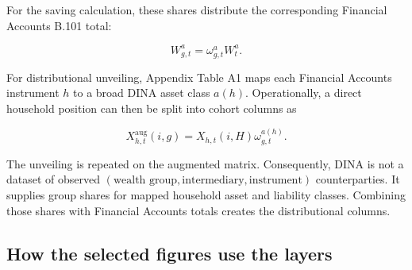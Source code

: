 \documentclass[11pt]{article}
\begin{document}
For the saving calculation, these shares distribute the corresponding
Financial Accounts B.101 total:

\begin{equation}
  W^a_{g,t}=\omega^a_{g,t}W^a_t.
  \label{eq:dina-times-b101}
\end{equation}

For distributional unveiling, Appendix Table A1 maps each Financial Accounts
instrument \(h\) to a broad DINA asset class \(a(h)\).  Operationally, a direct
household position can then be split into cohort columns as

\begin{equation}
  X^{\mathrm{aug}}_{h,t}(i,g)
  =X_{h,t}(i,H)\omega^{a(h)}_{g,t}.
  \label{eq:augmented-household-column}
\end{equation}

The unveiling is repeated on the augmented matrix.  Consequently, DINA is not
a dataset of observed
\((\text{wealth group},\text{intermediary},\text{instrument})\) counterparties.
It supplies group shares for mapped household asset and liability classes.
Combining those shares with Financial Accounts totals creates the
distributional columns.

\subsection{How the selected figures use the layers}
\end{document}
